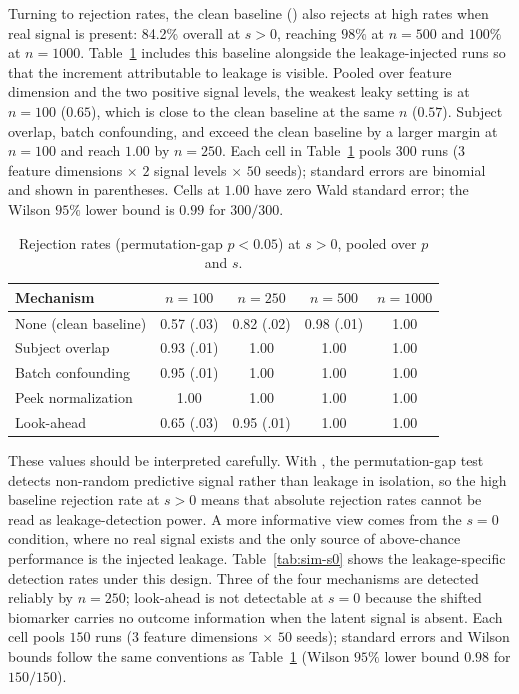 \documentclass[article,shortnames]{jss}
\begin{document}
Turning to rejection rates, the clean baseline () also rejects at
high rates when real signal is present: 84.2\% overall at $s > 0$,
reaching $98\%$ at $n = 500$ and $100\%$ at $n = 1000$.
Table~\ref{tab:sim-power} includes this baseline alongside the leakage-injected
runs so that the increment attributable to leakage is visible. Pooled over
feature dimension and the two positive signal levels, the weakest leaky setting
is  at $n = 100$ ($0.65$), which is close to the clean
baseline at the same $n$ ($0.57$). Subject overlap, batch confounding, and
 exceed the clean baseline by a larger margin at $n = 100$
and reach $1.00$ by $n = 250$.
Each cell in Table~\ref{tab:sim-power} pools $300$ runs
($3$ feature dimensions $\times$ $2$ signal levels $\times$ $50$ seeds);
standard errors are binomial and shown in parentheses. Cells at $1.00$
have zero Wald standard error; the Wilson $95\%$ lower bound is $0.99$
for $300/300$.

\begin{table}[tbp]
\centering
\caption{Rejection rates (permutation-gap $p < 0.05$) at $s > 0$, pooled
over $p$ and $s$.}
\label{tab:sim-power}
\begin{tabular}{|l|c|c|c|c|}
\hline
\textbf{Mechanism} & \textbf{$n=100$} & \textbf{$n=250$} & \textbf{$n=500$} & \textbf{$n=1000$} \\
\hline
None (clean baseline) & 0.57 (.03) & 0.82 (.02) & 0.98 (.01) & 1.00 \\
\hline
Subject overlap & 0.93 (.01) & 1.00 & 1.00 & 1.00 \\
\hline
Batch confounding & 0.95 (.01) & 1.00 & 1.00 & 1.00 \\
\hline
Peek normalization & 1.00 & 1.00 & 1.00 & 1.00 \\
\hline
Look-ahead & 0.65 (.03) & 0.95 (.01) & 1.00 & 1.00 \\
\hline
\end{tabular}
\end{table}

\noindent

These values should be interpreted carefully. With
, the permutation-gap test detects non-random
predictive signal rather than leakage in isolation, so the high baseline
rejection rate at $s > 0$ means that absolute rejection rates cannot be
read as leakage-detection power. A more informative view comes from the
$s = 0$ condition, where no real signal exists and the only source of
above-chance performance is the injected leakage. Table~\ref{tab:sim-s0} shows the
leakage-specific detection rates under this design. Three of the four
mechanisms are detected reliably by $n = 250$; look-ahead is not detectable
at $s = 0$ because the shifted biomarker carries no outcome information
when the latent signal is absent.
Each cell pools $150$ runs ($3$ feature dimensions $\times$ $50$ seeds);
standard errors and Wilson bounds follow the same conventions as
Table~\ref{tab:sim-power} (Wilson $95\%$ lower bound $0.98$ for $150/150$).
\end{document}
